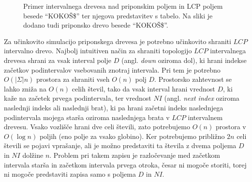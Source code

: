 \begin{figure}[tb]
    \begin{subfigure}[C]{0.45\linewidth}
        \vfill       
        
        \centering
        \vfill
        \subcaption*{}
        \label{fig:aSADrevo}
    \end{subfigure}
    \hfill
    \begin{subfigure}[C]{0.45\linewidth}        
        
        \centering
        \subcaption*{}
        \label{fig:aSAPolje}
    \end{subfigure}
   
    \caption{Primer intervalnega drevesa nad priponskim poljem in LCP poljem besede \enquote{KOKOŠ\$} ter njegova predstavitev s tabelo. Na sliki je dodano tudi priponsko drevo besede \enquote{KOKOŠ\$}.} 
    \label{fig:intervalTree}
\end{figure}

Za učinkovito simulacijo priponskega drevesa je potrebno učinkovito shraniti $LCP$ intervalno drevo. Najbolj intuitiven način za shraniti topologijo $LCP$ intervalnega drevesa shrani za vsak interval polje $D$ (angl. \textit{down} oziroma dol), ki hrani indekse začetkov podintervalov vsebovanih znotraj intervala. Pri tem je potrebno $O(|\Sigma|n)$ prostora za shraniti vseh $O(n)$ polj $D$. Prostorsko zahtevnost se lahko zniža na $O(n)$ celih števil, tako da vsak interval hrani vrednost $D$, ki kaže na začetek prvega podintervala, ter vrednost $NI$ (angl. \textit{next index} oziroma naslednji indeks ali naslednji brat), ki pa hrani začetni indeks naslednjega podintervala mojega starša oziroma naslednjega brata v $LCP$ intervalnem drevesu. Vsako vozlišče hrani dve celi števili, zato potrebujemo $O(n)$ prostora v $O(\log{n})$ poljih (eno polje za vsako globino). Ker potrebujemo približno $2n$ celi števili se pojavi vprašanje, ali je možno predstaviti ta števila z dvema poljema $D$ in $NI$ dolžine $n$. Problem pri takem zapisu je razločevanje med začetkom intervala starša in začetkom intervala prvega otroka, česar ni mogoče storiti, torej ni mogoče predstaviti zapisa samo s poljema $D$ in $NI$.


